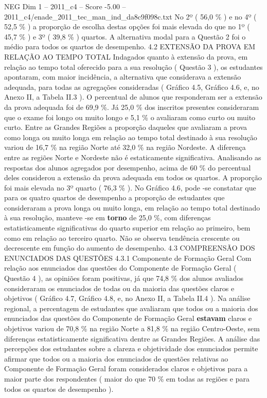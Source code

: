 \begin{textsample}{NEG Dim 1 – 2011\_c4 – Score -5.00 – 2011\_c4/enade\_2011\_tec\_man\_ind\_da8c9f098c.txt}
No 2º ( 56,0 \% ) e no 4º ( 52,5 \% ) a proporção de escolha destas opções foi mais elevada do que no 1º ( 45,7 \% ) e 3º ( 39,8 \% ) quartos.
A alternativa modal para a Questão 2 foi o médio para todos os quartos de desempenho. 4.2 EXTENSÃO DA PROVA EM RELAÇÃO AO TEMPO TOTAL Indagados quanto à extensão da prova, em relação ao tempo total oferecido para a sua resolução ( Questão 3 ), os estudantes apontaram, com maior incidência, a alternativa que considerava a extensão adequada, para todas as agregações consideradas ( Gráfico 4.5, Gráfico 4.6, e, no Anexo II, a Tabela II.3 ).
O percentual de alunos que responderam ser a extensão da prova adequada foi de 69,9 \%.
Já 25,0 \% dos inscritos presentes consideraram que o exame foi longo ou muito longo e 5,1 \% o avaliaram como curto ou muito curto.
Entre as Grandes Regiões a proporção daqueles que avaliaram a prova como longa ou muito longa em relação ao tempo total destinado à sua resolução variou de 16,7 \% na região Norte até 32,0 \% na região Nordeste.
A diferença entre as regiões Norte e Nordeste não é estaticamente significativa.
Analisando as respostas dos alunos agregados por desempenho, acima de 60 \% do percentual deles considerou a extensão da prova adequada em todos os quartos.
A proporção foi mais elevada no 3º quarto ( 76,3 \% ).
No Gráfico 4.6, pode -se constatar que para os quatro quartos de desempenho a proporção de estudantes que consideraram a prova longa ou muito longa, em relação ao tempo total destinado à sua resolução, manteve -se em \textbf{torno} de 25,0 \%, com diferenças estatisticamente significativas do quarto superior em relação ao primeiro, bem como em relação ao terceiro quarto.
Não se observa tendência crescente ou decrescente em função do aumento de desempenho. 4.3 COMPREENSÃO DOS ENUNCIADOS DAS QUESTÕES 4.3.1 Componente de Formação Geral Com relação aos enunciados das questões do Componente de Formação Geral ( Questão 4 ), as opiniões foram positivas, já que 74,8 \% dos alunos avaliados consideraram os enunciados de todas ou da maioria das questões claros e objetivos ( Gráfico 4.7, Gráfico 4.8, e, no Anexo II, a Tabela II.4 ).
Na análise regional, a percentagem de estudantes que avaliaram que todos ou a maioria dos enunciados das questões do Componente de Formação Geral \textbf{estavam} claros e objetivos variou de 70,8 \% na região Norte a 81,8 \% na região Centro-Oeste, sem diferenças estatisticamente significativa dentre as Grandes Regiões.
A análise das percepções dos estudantes sobre a clareza e objetividade dos enunciados permite afirmar que todos ou a maioria dos enunciados de questões relativas ao Componente de Formação Geral foram considerados claros e objetivos para a maior parte dos respondentes ( maior do que 70 \% em todas as regiões e para todos os quartos de desempenho ).

\end{textsample}
